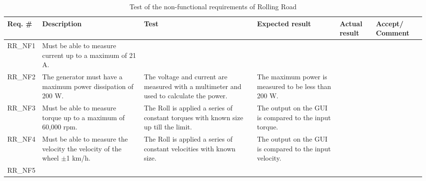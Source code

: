 \begin{table}[h!]
	\centering
	\label{my-label}
	\begin{tabular}{|p{1.5 cm}|p{2.1 cm}|p{2.1 cm}|p{2.1 cm}|p{2.1 cm}|p{2.1 cm}|}
		\hline
		Req. \# & Description                                                              & Test                                                                                    & Expected result                                          & Actual result & Accept/ Comment \\ \hline
		RR\_NF1 & Must be able to measure current up to a maximum of 21 A.                 &                                                                                         &                                                          &               &                \\ \hline
		RR\_NF2 & The generator must have a maximum power dissipation of 200 W.            & The voltage and current are measured with a multimeter and used to calculate the power. & The maximum power is measured to be less than 200 W.     &               &                \\ \hline
		RR\_NF3 & Must be able to measure torque up  to a maximum of 60,000 rpm.           & The Roll is applied a series of constant torques with known size up till the limit.     & The output on the GUI is compared to the input torque.   &               &                \\ \hline
		RR\_NF4 & Must be able to measure the velocity the velocity of the wheel $\pm$1 km/h. & The Roll is applied a series of constant velocities with known size.                    & The output on the GUI is compared to the input velocity. &               &                \\ \hline
		RR\_NF5 &                                                                          &                                                                                         &                                                          &               &                \\ \hline
	\end{tabular}
	\caption{Test of the non-functional requirements of Rolling Road}
\end{table}